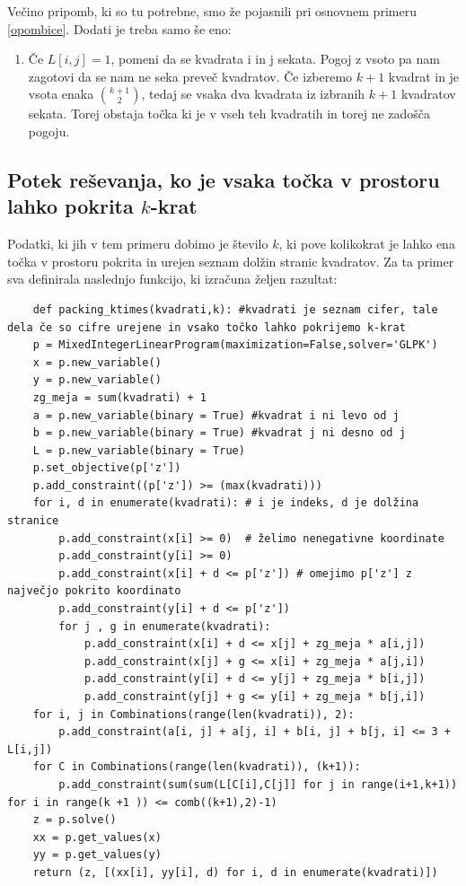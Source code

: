 \documentclass[a4paper, 11pt]{article}
\begin{document}
Večino pripomb, ki so tu potrebne, smo že pojasnili pri osnovnem primeru \ref{opombice}. Dodati je treba samo še eno:
\begin{enumerate}
    \item Če $L[i,j] = 1$, pomeni da se kvadrata i in j sekata. Pogoj z vsoto pa nam zagotovi da se nam ne seka preveč kvadratov. 
    Če izberemo $k+1$ kvadrat in je vsota enaka ${k+1 \choose 2}$, tedaj se vsaka dva kvadrata iz izbranih $k+1$ kvadratov sekata.
    Torej obstaja točka ki je v vseh teh kvadratih in torej ne zadošča pogoju.
\end{enumerate}    

\subsection{Potek reševanja, ko je vsaka točka v prostoru lahko pokrita $k$-krat}
Podatki, ki jih v tem primeru dobimo je število $k$,  ki pove kolikokrat je 
lahko ena točka v prostoru pokrita in urejen seznam dolžin stranic kvadratov.
Za ta primer sva definirala naslednjo funkcijo, ki izračuna željen razultat:

\begin{verbatim}
    def packing_ktimes(kvadrati,k): #kvadrati je seznam cifer, tale dela če so cifre urejene in vsako točko lahko pokrijemo k-krat
    p = MixedIntegerLinearProgram(maximization=False,solver='GLPK')
    x = p.new_variable()
    y = p.new_variable()
    zg_meja = sum(kvadrati) + 1
    a = p.new_variable(binary = True) #kvadrat i ni levo od j
    b = p.new_variable(binary = True) #kvadrat j ni desno od j
    L = p.new_variable(binary = True)
    p.set_objective(p['z'])
    p.add_constraint((p['z']) >= (max(kvadrati)))
    for i, d in enumerate(kvadrati): # i je indeks, d je dolžina stranice
        p.add_constraint(x[i] >= 0)  # želimo nenegativne koordinate
        p.add_constraint(y[i] >= 0)
        p.add_constraint(x[i] + d <= p['z']) # omejimo p['z'] z največjo pokrito koordinato
        p.add_constraint(y[i] + d <= p['z'])
        for j , g in enumerate(kvadrati):
            p.add_constraint(x[i] + d <= x[j] + zg_meja * a[i,j])
            p.add_constraint(x[j] + g <= x[i] + zg_meja * a[j,i])
            p.add_constraint(y[i] + d <= y[j] + zg_meja * b[i,j])
            p.add_constraint(y[j] + g <= y[i] + zg_meja * b[j,i])
    for i, j in Combinations(range(len(kvadrati)), 2):
        p.add_constraint(a[i, j] + a[j, i] + b[i, j] + b[j, i] <= 3 + L[i,j])
    for C in Combinations(range(len(kvadrati)), (k+1)):
        p.add_constraint(sum(sum(L[C[i],C[j]] for j in range(i+1,k+1)) for i in range(k +1 )) <= comb((k+1),2)-1)
    z = p.solve()
    xx = p.get_values(x)
    yy = p.get_values(y)
    return (z, [(xx[i], yy[i], d) for i, d in enumerate(kvadrati)]) 
\end{verbatim}
\end{document}

